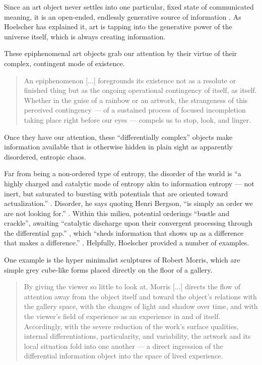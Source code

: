 \documentclass[letterpaper]{article}
\begin{document}
    Since an art object never settles into one particular, fixed state of communicated meaning, it is an open-ended, endlessly generative source of information \citep[p.7]{HoelscherThPtcsOfPhsSpc2014}. As Hoelscher has explained it, art is tapping into the generative power of the universe itself, which is always creating information.

    These epiphenomenal art objects grab our attention by their virtue of their complex, contingent mode of existence.

    \begin{quote}
        An epiphenomenon [...] foregrounds its existence not as a resolute or finished thing but as the ongoing operational contingency of itself, as itself. Whether in the guise of a rainbow or an artwork, the strangeness of this perceived contingency — of a sustained process of focused incompletion taking place right before our eyes — compels us to stop, look, and linger.
    \end{quote}

    Once they have our attention, these “differentially complex” \citep[p.74]{HoelscherArtAsInfrmtn2021} objects make information available that is otherwise hidden in plain sight as apparently disordered, entropic chaos.
    
    Far from being a non-ordered type of entropy, the disorder of the world is “a highly charged and catalytic mode of entropy akin to information entropy — not inert, but saturated to bursting with potentials that are oriented toward actualization.” \citep[p.72]{HoelscherArtAsInfrmtn2021}. Disorder, he says quoting Henri Bergson, “is simply an order we are not looking for.” \citep[p.73]{HoelscherArtAsInfrmtn2021}. Within this milieu, potential orderings “bustle and crackle”, awaiting “catalytic discharge upon their convergent processing through the differential gap.” \citep[p.73]{HoelscherArtAsInfrmtn2021}, which “sheds information that shows up as a difference that makes a difference.” \citep[p.75]{HoelscherArtAsInfrmtn2021}. Helpfully, Hoelscher provided a number of examples.

    One example is the hyper minimalist sculptures of Robert Morris, which are simple grey cube-like forms placed directly on the floor of a gallery.

    \begin{quote}
        By giving the viewer so little to look at, Morris [...] directs the flow of attention away from the object itself and toward the object's relations with the gallery space, with the changes of light and shadow over time, and with the viewer's field of experience as an experience in and of itself. Accordingly, with the severe reduction of the work's surface qualities, internal differentiations, particularity, and variability, the artwork and its local situation fold into one another — a direct ingression of the differential information object into the space of lived experience. \citep[p.78]{HoelscherArtAsInfrmtn2021}
    \end{quote}
\end{document}
